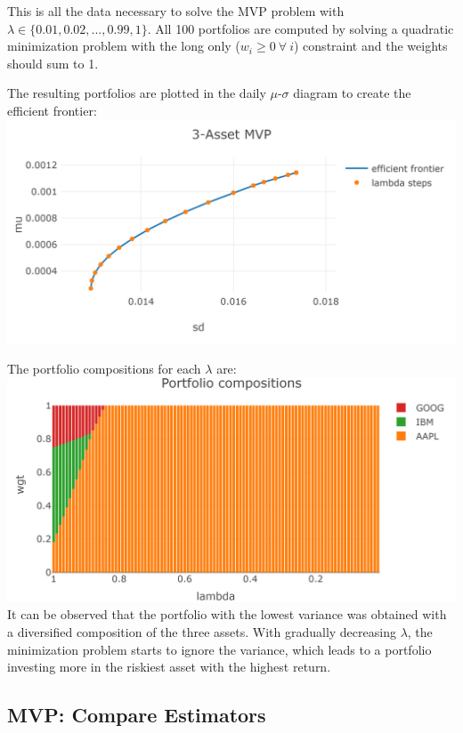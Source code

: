 \documentclass[
  oneside]{book}
\begin{document}
This is all the data necessary to solve the MVP problem with \(\lambda \in \{0.01, 0.02, ..., 0.99, 1\}\). All 100 portfolios are computed by solving a quadratic minimization problem with the long only (\(w_i \geq 0 \ \forall \ i\)) constraint and the weights should sum to 1.

The resulting portfolios are plotted in the daily \(\mu\)-\(\sigma\) diagram to create the efficient frontier:\\
\includegraphics{Master_Thesis_files/figure-latex/MVP_ex5-1.png}

The portfolio compositions for each \(\lambda\) are:\\
\includegraphics{Master_Thesis_files/figure-latex/MVP_ex6-1.png}
It can be observed that the portfolio with the lowest variance was obtained with a diversified composition of the three assets. With gradually decreasing \(\lambda\), the minimization problem starts to ignore the variance, which leads to a portfolio investing more in the riskiest asset with the highest return.

\hypertarget{mvp-compare-estimators}{%
\subsection{MVP: Compare Estimators}\label{mvp-compare-estimators}}
\end{document}
